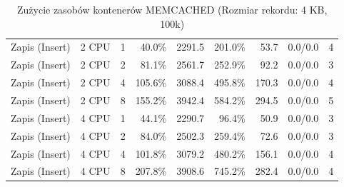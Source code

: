 \begin{table}[ht]
{\begin{tabular}{llcrrrrcc}
Zapis (Insert) & 2 CPU & 1 & 40.0\% & 2291.5 & 201.0\% & 53.7 & 0.0/0.0 & 4 \\
Zapis (Insert) & 2 CPU & 2 & 81.1\% & 2561.7 & 252.9\% & 92.2 & 0.0/0.0 & 3 \\
Zapis (Insert) & 2 CPU & 4 & 105.6\% & 3088.4 & 495.8\% & 170.3 & 0.0/0.0 & 4 \\
Zapis (Insert) & 2 CPU & 8 & 155.2\% & 3942.4 & 584.2\% & 294.5 & 0.0/0.0 & 5 \\
Zapis (Insert) & 4 CPU & 1 & 44.1\% & 2290.7 & 96.4\% & 50.9 & 0.0/0.0 & 3 \\
Zapis (Insert) & 4 CPU & 2 & 84.0\% & 2502.3 & 259.4\% & 72.6 & 0.0/0.0 & 3 \\
Zapis (Insert) & 4 CPU & 4 & 101.8\% & 3079.2 & 480.2\% & 156.1 & 0.0/0.0 & 4 \\
Zapis (Insert) & 4 CPU & 8 & 207.8\% & 3908.6 & 745.2\% & 282.4 & 0.0/0.0 & 4 \\
\bottomrule
\end{tabular}%
}
\caption{Zużycie zasobów kontenerów MEMCACHED (Rozmiar rekordu: 4 KB, 100k)}
\label{tab:resources_memcached_medium_100000}
\end{table}
